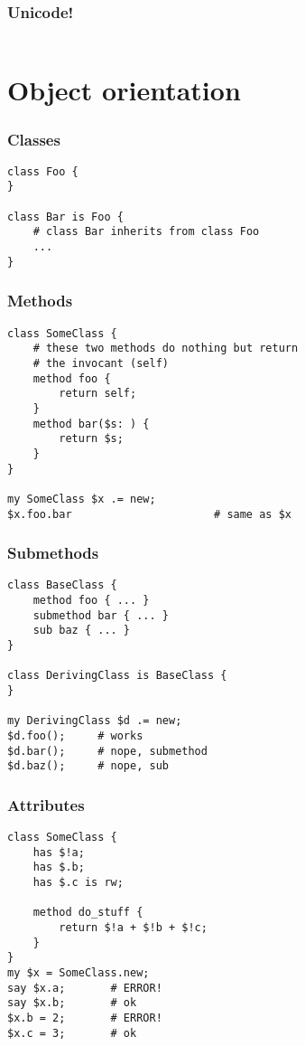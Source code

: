 \documentclass{beamer}
\begin{document}
\begin{frame}[fragile]
\frametitle{Unicode!}
\begin{verbatim}
\end{verbatim}
\end{frame}

\section{Object orientation}

\begin{frame}[fragile]
\frametitle{Classes}
\begin{verbatim}
class Foo {
}

class Bar is Foo { 
    # class Bar inherits from class Foo
    ...
}
\end{verbatim}
\end{frame}

\begin{frame}[fragile]
\frametitle{Methods}
\begin{verbatim}
class SomeClass {
    # these two methods do nothing but return
    # the invocant (self)
    method foo {
        return self;
    }
    method bar($s: ) {
        return $s;
    }
}

my SomeClass $x .= new;
$x.foo.bar                      # same as $x
\end{verbatim}
\end{frame}

\begin{frame}[fragile]
\frametitle{Submethods}
\begin{verbatim}
class BaseClass {
    method foo { ... }
    submethod bar { ... }
    sub baz { ... }
}

class DerivingClass is BaseClass {
}

my DerivingClass $d .= new;
$d.foo();     # works
$d.bar();     # nope, submethod
$d.baz();     # nope, sub
\end{verbatim}
\end{frame}

\begin{frame}[fragile]
\frametitle{Attributes}
\begin{verbatim}
class SomeClass {
    has $!a;
    has $.b;
    has $.c is rw;

    method do_stuff {
        return $!a + $!b + $!c;
    }
}
my $x = SomeClass.new;
say $x.a;       # ERROR!
say $x.b;       # ok
$x.b = 2;       # ERROR!
$x.c = 3;       # ok
\end{verbatim}
\end{frame}
\end{document}
